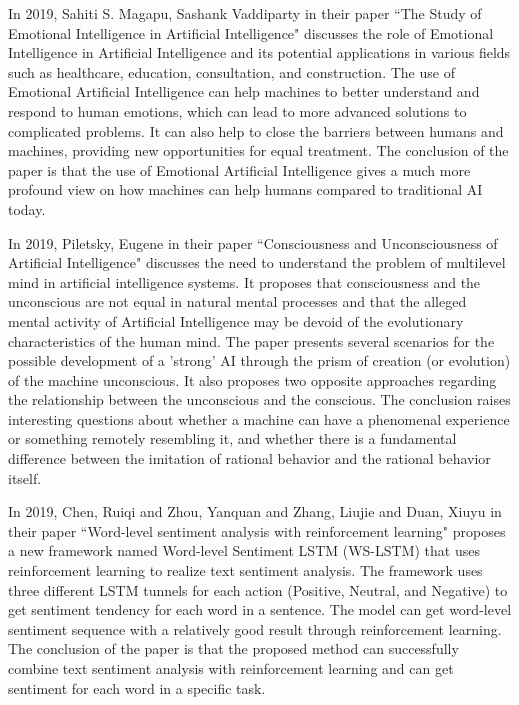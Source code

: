 In 2019, Sahiti S. Magapu, Sashank Vaddiparty in their paper ``The Study of Emotional Intelligence in
Artificial Intelligence" discusses the role of Emotional Intelligence in Artificial Intelligence and its potential applications in various fields such as healthcare, education, consultation, and construction. The use of Emotional Artificial Intelligence can help machines to better understand and respond to human emotions, which can lead to more advanced solutions to complicated problems. It can also help to close the barriers between humans and machines, providing new opportunities for equal treatment. The conclusion of the paper is that the use of Emotional Artificial Intelligence gives a much more profound view on how machines can help humans compared to traditional AI today\cite{ISSN-2456-2165}.

In 2019, Piletsky, Eugene in their paper ``Consciousness and Unconsciousness of Artificial Intelligence" discusses the need to understand the problem of multilevel mind in artificial intelligence systems. It proposes that consciousness and the unconscious are not equal in natural mental processes and that the alleged mental activity of Artificial Intelligence may be devoid of the evolutionary characteristics of the human mind. The paper presents several scenarios for the possible development of a 'strong' AI through the prism of creation (or evolution) of the machine unconscious. It also proposes two opposite approaches regarding the relationship between the unconscious and the conscious. The conclusion raises interesting questions about whether a machine can have a phenomenal experience or something remotely resembling it, and whether there is a fundamental difference between the imitation of rational behavior and the rational behavior itself\cite{article4}.

In 2019, Chen, Ruiqi and Zhou, Yanquan and Zhang, Liujie and Duan, Xiuyu in their paper ``Word-level sentiment analysis with reinforcement learning" proposes a new framework named Word-level Sentiment LSTM (WS-LSTM) that uses reinforcement learning to realize text sentiment analysis. The framework uses three different LSTM tunnels for each action (Positive, Neutral, and Negative) to get sentiment tendency for each word in a sentence. The model can get word-level sentiment sequence with a relatively good result through reinforcement learning. The conclusion of the paper is that the proposed method can successfully combine text sentiment analysis with reinforcement learning and can get sentiment for each word in a specific task\cite{article5}.

